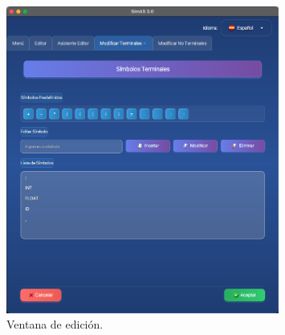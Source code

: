 \begin{figure}[htp]
\centering
	\includegraphics[width=0.8\textwidth]{figuras2/editor/panel_terminales.png}
	\caption{Ventana de edición.}
	\label{fig:d9}
\end{figure}

